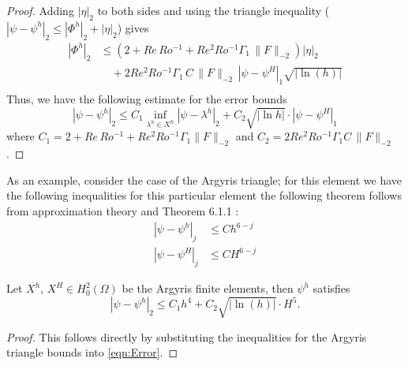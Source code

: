 \begin{proof}
  Adding $|\eta|_2$ to both sides and using the triangle inequality ($|\psi -
  \psi^h|_2 \le |\Phi^h|_2 + |\eta|_2$) gives
  \begin{align*}
    |\Phi^h|_2 &\le \left(2 + Re\, Ro^{-1} + Re^2 Ro^{-1} \Gamma_1\, \|F\|_{-2}\right) |\eta|_2 \\
      &\quad + 2 Re^2 Ro^{-1} \Gamma_1\, C\, \|F\|_{-2}\, |\psi - \psi^H|_1 \sqrt{|\ln(h)|} \\
  \end{align*}
  Thus, we have the following estimate for the error bounds
  \begin{equation*}
    |\psi-\psi^h|_2 \le C_1 \inf_{\lambda^h\in X^h} |\psi-\lambda^h|_2 + C_2 \sqrt{|\ln h|}\cdot |\psi -
      \psi^H|_1
  \end{equation*}
  where $C_1 = 2 + Re\,Ro^{-1} + Re^2 Ro^{-1} \Gamma_1 \|F\|_{-2}$ and $C_2= 2 Re^2 Ro^{-1} \Gamma_1
  C\,\|F\|_{-2}$.
\end{proof}

As an example, consider the case of the Argyris triangle; for this element we
have the following inequalities for this particular element the following
theorem follows from approximation theory \cite{Bernadou94} and Theorem 6.1.1
\cite{Ciarlet}:
\begin{align*}
  |\psi - \psi^h|_j &\le Ch^{6-j} \\
  |\psi - \psi^H|_j &\le CH^{6-j}
\end{align*}
\begin{corollary} \label{crl:Argyris2L}
  Let $X^h,\, X^H \in H^2_0(\Omega)$ be the Argyris finite elements, then
  $\psi^h$ satisfies
  \begin{equation}
    |\psi - \psi^h|_2 \le C_1 h^4 + C_2 \sqrt{|\ln(h)|}\cdot H^5.
    \label{eqn:TwoLevelError}
  \end{equation}
\end{corollary}
\begin{proof}
  This follows directly by substituting the inequalities for the Argyris
  triangle bounds into \eqref{eqn:Error}.
\end{proof}
